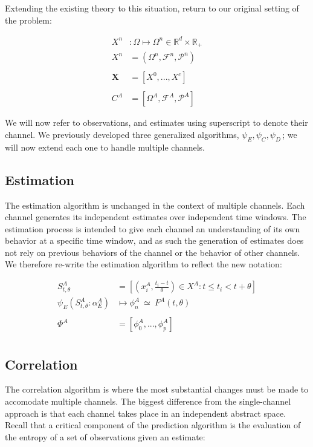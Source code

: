 \documentclass[11pt,titlepage]{article}
\begin{document}
Extending the existing theory to this situation, return to our original setting of the problem:

\[ 
\begin{align}
X^n &: \Omega \mapsto \Omega^n \in \mathbb{R}^d \times \mathbb{R}_+ \\
X^n &= (\Omega^n,\mathcal{F}^n,\mathcal{P}^n) \\
\\
\mathbf{X} &= [X^0,...,X^c]   \\
\\
C^A &= [\Omega^A,\mathcal{F}^A,\mathcal{P}^A]
\end{align}
\]

We will now refer to observations, and estimates using superscript to denote their channel.  We previously developed three generalized algorithms, \(\psi_E, \psi_C, \psi_D \,\!\); we will now extend each one to handle multiple channels.

\subsection{Estimation}
The estimation algorithm is unchanged in the context of multiple channels.  Each channel generates its independent estimates over independent time windows.  The estimation process is intended to give each channel an understanding of its own behavior at a specific time window, and as such the generation of estimates does not rely on previous behaviors of the channel or the behavior of other channels.  We therefore re-write the estimation algorithm to reflect the new notation:

\[ 
\begin{align}
S_{t,\theta}^A &= [ (x_i^A,\frac{t_i - t}{\theta}) \in X^A : t \le t_i < t+\theta ] \\
\psi_E( S_{t,\theta}^A:\alpha_E^A ) &\mapsto \phi_n^A \ \simeq \ F^A(t,\theta)  \\
\\
\Phi^A &= [\phi_0^A,...,\phi_p^A ] \\
\end{align}
\]

\subsection{Correlation}
The correlation algorithm is where the most substantial changes must be made to accomodate multiple channels.  The biggest difference from the single-channel approach is that each channel takes place in an independent abstract space.  Recall that a critical component of the prediction algorithm is the evaluation of the entropy of a set of observations given an estimate:
\end{document}
